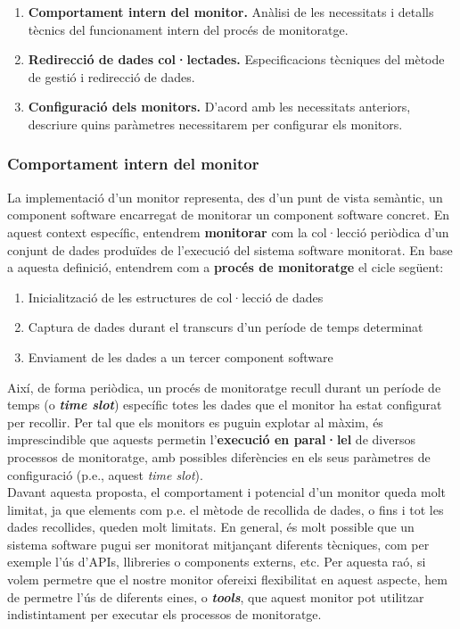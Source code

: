 \begin{enumerate}
\item \textbf{Comportament intern del monitor.} Anàlisi de les necessitats i detalls tècnics del funcionament intern del procés de monitoratge.
\item \textbf{Redirecció de dades col·lectades.} Especificacions tècniques del mètode de gestió i redirecció de dades.
\item \textbf{Configuració dels monitors.} D'acord amb les necessitats anteriors, descriure quins paràmetres necessitarem per configurar els monitors.
\end{enumerate}

\subsubsection{Comportament intern del monitor}

La implementació d'un monitor representa, des d'un punt de vista semàntic, un component software encarregat de monitorar un component software concret. En aquest context específic, entendrem \textbf{monitorar} com la col·lecció periòdica d'un conjunt de dades produïdes de l'execució del sistema software monitorat. En base a aquesta definició, entendrem com a \textbf{procés de monitoratge} el cicle següent:

\begin{enumerate}
\item Inicialització de les estructures de col·lecció de dades
\item Captura de dades durant el transcurs d'un període de temps determinat
\item Enviament de les dades a un tercer component software
\end{enumerate}

Així, de forma periòdica, un procés de monitoratge recull durant un període de temps (o \textbf{\textit{time slot}}) específic totes les dades que el monitor ha estat configurat per recollir. Per tal que els monitors es puguin explotar al màxim, és imprescindible que aquests permetin l'\textbf{execució en paral·lel} de diversos processos de monitoratge, amb possibles diferències en els seus paràmetres de configuració (p.e., aquest \textit{time slot}).\\

Davant aquesta proposta, el comportament i potencial d'un monitor queda molt limitat, ja que elements com p.e. el mètode de recollida de dades, o fins i tot les dades recollides, queden molt limitats. En general, és molt possible que un sistema software pugui ser monitorat mitjançant diferents tècniques, com per exemple l'ús d'APIs, llibreries o components externs, etc. Per aquesta raó, si volem permetre que el nostre monitor ofereixi flexibilitat en aquest aspecte, hem de permetre l'ús de diferents eines, o \textbf{\textit{tools}}, que aquest monitor pot utilitzar indistintament per executar els processos de monitoratge.\\

